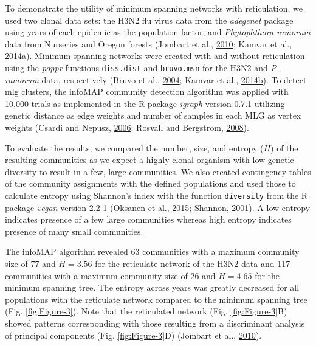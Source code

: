 \documentclass[double,12pt]{beavtex}
\begin{document}
  To demonstrate the utility of minimum spanning networks with
  reticulation, we used two clonal data sets: the H3N2 flu virus data from
  the \emph{adegenet} package using years of each epidemic as the
  population factor, and \emph{Phytophthora ramorum} data from Nurseries
  and Oregon forests (Jombart et al.,
  \protect\hyperlink{ref-jombart2010discriminant}{2010}; Kamvar et al.,
  \protect\hyperlink{ref-kamvar2014sudden}{2014}\protect\hyperlink{ref-kamvar2014sudden}{a}).
  Minimum spanning networks were created with and without reticulation
  using the \emph{poppr} functions \texttt{diss.dist} and
  \texttt{bruvo.msn} for the H3N2 and \emph{P. ramorum} data, respectively
  (Bruvo et al., \protect\hyperlink{ref-bruvo2004simple}{2004}; Kamvar et
  al.,
  \protect\hyperlink{ref-kamvar2014poppr}{2014}\protect\hyperlink{ref-kamvar2014poppr}{b}).
  To detect mlg clusters, the infoMAP community detection algorithm was
  applied with 10,000 trials as implemented in the R package \emph{igraph}
  version 0.7.1 utilizing genetic distance as edge weights and number of
  samples in each MLG as vertex weights (Csardi and Nepusz,
  \protect\hyperlink{ref-csardi2006igraph}{2006}; Rosvall and Bergstrom,
  \protect\hyperlink{ref-rosvall2008maps}{2008}).
  
  To evaluate the results, we compared the number, size, and entropy
  (\(H\)) of the resulting communities as we expect a highly clonal
  organism with low genetic diversity to result in a few, large
  communities. We also created contingency tables of the community
  assignments with the defined populations and used those to calculate
  entropy using Shannon's index with the function \texttt{diversity} from
  the R package \emph{vegan} version 2.2-1 (Oksanen et al.,
  \protect\hyperlink{ref-oksanen2015vegan}{2015}; Shannon,
  \protect\hyperlink{ref-shannon2001mathematical}{2001}). A low entropy
  indicates presence of a few large communities whereas high entropy
  indicates presence of many small communities.
  
  The infoMAP algorithm revealed 63 communities with a maximum community
  size of 77 and \(H = 3.56\) for the reticulate network of the H3N2 data
  and 117 communities with a maximum community size of 26 and \(H = 4.65\)
  for the minimum spanning tree. The entropy across years was greatly
  decreased for all populations with the reticulate network compared to
  the minimum spanning tree (Fig. \ref{fig:Figure-3}). Note that the
  reticulated network (Fig. \ref{fig:Figure-3}B) showed patterns
  corresponding with those resulting from a discriminant analysis of
  principal components (Fig. \ref{fig:Figure-3}D) (Jombart et al.,
  \protect\hyperlink{ref-jombart2010discriminant}{2010}).
  
\end{document}
